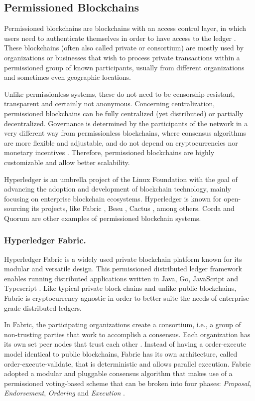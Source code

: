 \documentclass[runningheads]{llncs}
\begin{document}
\subsection{Permissioned Blockchains} \label{permissioned}
Permissioned blockchains are blockchains with an access control layer, in which users need to authenticate themselves in order to have access to the ledger \cite{survey}. These blockchains (often also called private or consortium) are mostly used by organizations or businesses that wish to process private transactions within a permissioned group of known participants, usually from different organizations and sometimes even geographic locations.

Unlike permissionless systems, these do not need to be censorship-resistant, transparent and certainly not anonymous. Concerning centralization, permissioned blockchains can be fully centralized (yet distributed) or partially decentralized. Governance is determined by the participants of the network in a very different way from permissionless blockchains, where consensus algorithms are more flexible and adjustable, and do not depend on cryptocurrencies nor monetary incentives \cite{survey}. Therefore, permissioned blockchains are highly customizable and allow better scalability.

Hyperledger \cite{hyperledger} is an umbrella project of the Linux Foundation with the goal of advancing the adoption and development of blockchain technology, mainly focusing on enterprise blockchain ecosystems. Hyperledger is known for open-sourcing its projects, like Fabric \cite{fabric}, Besu \cite{besu}, Cactus \cite{cactus}, among others. Corda \cite{corda} and Quorum \cite{quorum} are other examples of permissioned blockchain systems.


\subsubsection{Hyperledger Fabric.}
Hyperledger Fabric is a widely used private blockchain platform known for its modular and versatile design. This permissioned distributed ledger framework enables running distributed applications written in Java, Go, JavaScript and Typescript \cite{fabric}. Like typical private block-chains and unlike public blockchains, Fabric is cryptocurrency-agnostic in order to better suite the needs of enterprise-grade distributed ledgers.

In Fabric, the participating organizations create a consortium, i.e., a group of non-trusting parties that work to accomplish a consensus. Each organization has its own set peer nodes that trust each other \cite{fabric}. Instead of having a order-execute model identical to public blockchains, Fabric has its own architecture, called order-execute-validate, that is deterministic and allows parallel execution. Fabric adopted a modular and pluggable consensus algorithm that makes use of a permissioned voting-based scheme that can be broken into four phases: \textit{Proposal}, \textit{Endorsement}, \textit{Ordering} and \textit{Execution} \cite{hyperledgerlabs}.
\end{document}
